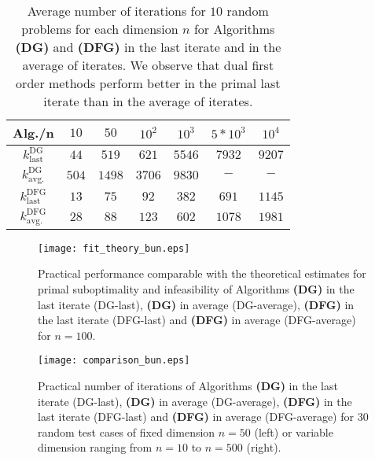 \documentclass{gOMS2e}
\theoremstyle{plain}
\theoremstyle{definition}
\theoremstyle{remark}
\begin{document}
\begin{table*}[ht]
\label{table_nss} \centering \caption{Average number of iterations
for $10$ random problems for each dimension $n$ for Algorithms
\textbf{(DG)} and \textbf{(DFG)} in the last iterate and in the
average of iterates.   We  observe that dual first order methods perform
better in the primal last iterate than in the average of iterates.}
\begin{tabular}{|c|c|c|c|c|c|c|}
\hline Alg./n                     & $10$  & $50$  & $10^2$  &  $10^3$   & $5*10^3$  &  $10^4$  \\
\hline
$k_{\mathrm{last}}^{\mathrm{DG}}$ & $44$  & $519$ & $621$ & $5546$  &  $7932$   &  $9207$\\
\hline

$k_{\mathrm{avg.}}^\mathrm{DG}$  & $504$ & $1498$ & $3706$ & $9830$ & $-$ & $-$ \\
\hline \hline

$k_{\mathrm{last}}^{\mathrm{DFG}}$   & $13$   & $75$ & $92$  & $382$    & $691$    & $1145$ \\
\hline

$k_{\mathrm{avg.}}^{\mathrm{DFG}}$   & $28$    & $88$ & $123$  & $602$  & $1078$   & $1981$ \\
\hline
\end{tabular}
\end{table*}

\begin{figure}[ht]
\label{fig_fit} \caption{Practical performance comparable with the
theoretical estimates for primal suboptimality and infeasibility of
Algorithms  \textbf{(DG)} in the last iterate (DG-last),
\textbf{(DG)} in average (DG-average), \textbf{(DFG)} in the last
iterate (DFG-last) and \textbf{(DFG)} in average (DFG-average) for
$n=100$.}
\centerline{\texttt{[image: fit\_theory\_bun.eps]}}
\end{figure}

\begin{figure}[ht]
\label{fig_fitt} \caption{Practical number of iterations  of
Algorithms \textbf{(DG)} in the last iterate (DG-last),
\textbf{(DG)} in average (DG-average), \textbf{(DFG)} in the last
iterate (DFG-last) and \textbf{(DFG)} in average (DFG-average) for
$30$ random test cases of fixed dimension  $n=50$ (left) or variable
dimension ranging from $n=10$ to $n = 500$ (right).}
\centerline{\texttt{[image: comparison\_bun.eps]}}
\end{figure}
\end{document}
